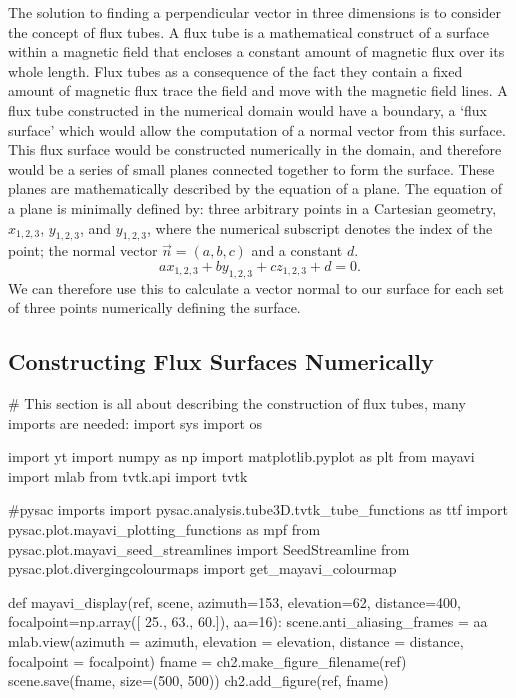 The solution to finding a perpendicular vector in three dimensions is to consider the concept of flux tubes.
A flux tube is a mathematical construct of a surface within a magnetic field that encloses a constant amount of magnetic flux over its whole length.
Flux tubes as a consequence of the fact they contain a fixed amount of magnetic flux trace the field and move with the magnetic field lines.
A flux tube constructed in the numerical domain would have a boundary, a `flux surface' which would allow the computation of a normal vector from this surface.
This flux surface would be constructed numerically in the domain, and therefore would be a series of small planes connected together to form the surface.
These planes are mathematically described by the equation of a plane.
The equation of a plane is minimally defined by: three arbitrary points in a Cartesian geometry, $x_{1,2,3}$, $y_{1,2,3}$, and $y_{1,2,3}$, where the numerical subscript denotes the index of the point; the normal vector $\vec{n}=(a,b,c)$ and a constant $d$.
\begin{equation}
	ax_{1,2,3}+by_{1,2,3}+cz_{1,2,3}+d=0.
\end{equation}
We can therefore use this to calculate a vector normal to our surface for each set of three points numerically defining the surface.

\subsection{Constructing Flux Surfaces Numerically}
\begin{pycode}
# This section is all about describing the construction of flux tubes, many imports are needed:
import sys
import os

import yt
import numpy as np
import matplotlib.pyplot as plt
from mayavi import mlab
from tvtk.api import tvtk

#pysac imports
import pysac.analysis.tube3D.tvtk_tube_functions as ttf
import pysac.plot.mayavi_plotting_functions as mpf
from pysac.plot.mayavi_seed_streamlines import SeedStreamline
from pysac.plot.divergingcolourmaps import get_mayavi_colourmap

def mayavi_display(ref, scene, azimuth=153, elevation=62, distance=400, focalpoint=np.array([  25.,   63.,  60.]), aa=16):
    scene.anti_aliasing_frames = aa
    mlab.view(azimuth = azimuth, elevation = elevation, distance = distance, focalpoint = focalpoint)
    fname = ch2.make_figure_filename(ref)
    scene.save(fname, size=(500, 500))
    ch2.add_figure(ref, fname)
    
\end{pycode}

